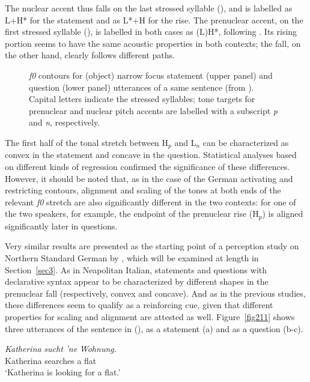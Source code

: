 The nuclear accent thus falls on the last stressed syllable (), and is labelled as L+H* for the statement and as L*+H for the rise. The prenuclear accent, on the first stressed syllable (), is labelled in both cases as (L)H*, following \citet{gilifivela2003tonal,gilifivela2006coding}. Its rising portion seems to have the same acoustic properties in both contexts; the fall, on the other hand, clearly follows different paths.

\begin{figure}[t]
\centering
{}
\caption{\textit{f0} contours for (object) narrow focus statement (upper panel) and question (lower panel) utterances of a same sentence (from \citealt[Figure 1]{petrone2008tonal}). Capital letters indicate the stressed syllables; tone targets for prenuclear and nuclear pitch accents are labelled with a subscript \textit{p} and \textit{n}, respectively.}
\label{fig210}\end{figure}

The first half of the tonal stretch between H$_{p}$ and L$_{n}$ can be characterized as convex in the statement and concave in the question. Statistical analyses based on different kinds of regression confirmed the significance of these differences. However, it should be noted that, as in the case of the German activating and restricting contours, alignment and scaling of the tones at both ends of the relevant \textit{f0} stretch are also significantly different in the two contexts: for one of the two speakers, for example, the endpoint of the prenuclear rise (H$_{p}$) is aligned significantly later in questions. 

Very similar results are presented as the starting point of a perception study on Northern Standard German by \cite{petrone2014intonation}, which will be examined at length in Section~\ref{sec3}. As in Neapolitan Italian, statements and questions with declarative syntax appear to be characterized by different shapes in the prenuclear fall (respectively, convex and concave). And as in the previous studies, these differences seem to qualify as a reinforcing cue, given that different properties for scaling and alignment are attested as well. Figure~\ref{fig211} shows three utterances of the sentence in (), as a statement (a) and as a question (b-c). 

\ea
\gll \textit{Katherina} \textit{sucht} \textit{'ne} \textit{Wohnung.}\\
Katherina searches a flat\\
\glt ‘Katherina is looking for a flat.’
\z

